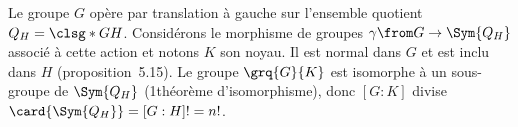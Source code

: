 Le groupe $G$ opère par translation à gauche sur l'ensemble quotient $Q_H = \smash{\clsg*{G}{H}}$.
Considérons le morphisme de groupes $\gamma\from G\to\Sym{Q_H}$ associé à cette action et notons $K$ son noyau.
Il est normal dans $G$ et est inclu dans $H$ (proposition~5.15).
Le groupe $\grq{G}{K}$ est isomorphe à un sous-groupe de $\Sym{Q_H}$ (1\ier théorème d'isomorphisme), donc $[G:K]$ divise $\card{\Sym{Q_H}} = [G:H]! = n!$.
